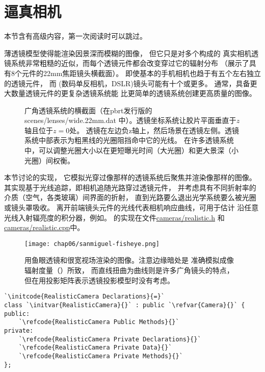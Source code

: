 \section{逼真相机}\label{sec:逼真相机}
\begin{remark}
    本节含有高级内容，第一次阅读时可以跳过。
\end{remark}

薄透镜模型使得能渲染因景深而模糊的图像，
但它只是对多个构成的
真实相机透镜系统非常粗糙的近似，而每个透镜元件都会改变穿过它的辐射分布
（展示了具有8个元件的22mm焦距镜头横截面）。
即使基本的手机相机也趋于有五个左右独立的透镜元件，
而
(数码单反相机，DSLR)镜头可能有十个或更多。
通常，具备更大数量透镜元件的更复杂透镜系统能
比更简单的透镜系统创建更高质量的图像。
\begin{figure}[htbp]
    \centering
    \caption{广角透镜系统的横截面（在pbrt发行版的{\ttfamily scenes/lenses/wide.22mm.dat}
    中）。透镜坐标系统让胶片平面垂直于$z$轴且位于$z=0$处。
    透镜在左边负z轴上，然后场景在透镜左侧。透镜系统中部表示为粗黑线的光圈阻挡命中它的光线。
    在许多透镜系统中，可以调整光圈大小以在更短曝光时间（大光圈）和更大景深（小光圈）间权衡。}
    \label{fig:6.15}
\end{figure}

本节讨论的实现，
它模拟光穿过像那样的透镜系统后聚焦并渲染像那样的图像。
其实现基于光线追踪，即相机追随光路穿过透镜元件，
并考虑具有不同折射率的介质（空气，各类玻璃）间界面的折射，
直到光路要么退出光学系统要么被光圈或镜头罩吸收。
离开前端镜头元件的光线代表相机响应曲线，可用于估计
沿任意光线入射辐亮度的积分器，例如。
的实现在文件\href{https://github.com/mmp/pbrt-v3/tree/master/src/cameras/realistic.h}{\ttfamily cameras/realistic.h}
和\href{https://github.com/mmp/pbrt-v3/tree/master/src/cameras/realistic.cpp}{\ttfamily cameras/realistic.cpp}中。
\begin{figure}[htbp]
    \centering\texttt{[image: chap06/sanmiguel-fisheye.png]}
    \caption{用鱼眼透镜和很宽视场渲染的图像。注意边缘暗处是
        准确模拟成像辐射度量（）所致，
        而直线扭曲为曲线则是许多广角镜头的特点，但在用投影矩阵表示透镜投影模型时没有考虑。}
    \label{fig:6.16}
\end{figure}
\begin{lstlisting}
`\initcode{RealisticCamera Declarations}{=}`
class `\initvar{RealisticCamera}{}` : public `\refvar{Camera}{}` {
public:
    `\refcode{RealisticCamera Public Methods}{}`
private:
    `\refcode{RealisticCamera Private Declarations}{}`
    `\refcode{RealisticCamera Private Data}{}`
    `\refcode{RealisticCamera Private Methods}{}`
};
\end{lstlisting}

